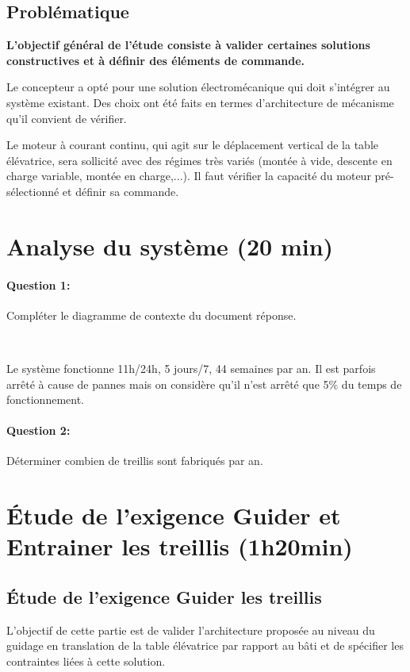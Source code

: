 \subsection{Problématique}

\textbf{L'objectif général de l'étude consiste à valider certaines solutions constructives et à définir des éléments de commande.}

Le concepteur a opté pour une solution électromécanique qui doit s'intégrer au système existant. Des choix ont été faits en termes d'architecture de mécanisme qu'il convient de vérifier.

Le moteur à courant continu, qui agit sur le déplacement vertical de la table élévatrice, sera sollicité avec des régimes très variés (montée à vide, descente en charge variable, montée en charge,...). Il faut vérifier la capacité du moteur pré-sélectionné et définir sa commande.

\section{Analyse du système (20 min)}

\paragraph{Question 1:} Compléter le diagramme de contexte du document réponse.

~\

Le système fonctionne 11h/24h, 5 jours/7, 44 semaines par an. Il est parfois arrêté à cause de pannes mais on considère qu'il n'est arrêté que 5\% du temps de fonctionnement.

\paragraph{Question 2:} Déterminer combien de treillis sont fabriqués par an.

\section{Étude de l'exigence \og Guider et Entrainer les treillis \fg (1h20min)}

\subsection{Étude de l'exigence \og Guider les treillis \fg}

L'objectif de cette partie est de valider l'architecture proposée au niveau du guidage en translation de la table élévatrice par rapport au bâti et de spécifier les contraintes liées à cette solution.

